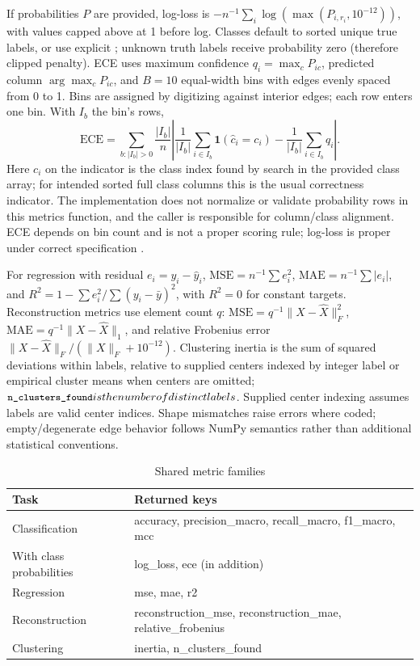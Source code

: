 ﻿\documentclass[conference]{IEEEtran}
\begin{document}
If probabilities \(P\) are provided, log-loss is \(-n^{-1}\sum_i\log(\max(P_{i,r_i},10^{-12}))\), with values capped above at 1 before log. Classes default to sorted unique true labels, or use explicit ; unknown truth labels receive probability zero (therefore clipped penalty). ECE uses maximum confidence \(q_i=\max_cP_{ic}\), predicted column \(\arg\max_cP_{ic}\), and \(B=10\) equal-width bins with edges evenly spaced from 0 to 1. Bins are assigned by digitizing against interior edges; each row enters one bin. With \(I_b\) the bin's rows,
\[
\mathrm{ECE}=\sum_{b:|I_b|>0}\frac{|I_b|}{n}\left|\frac{1}{|I_b|}\sum_{i\in I_b}\mathbf1(\hat c_i=c_i)-\frac{1}{|I_b|}\sum_{i\in I_b}q_i\right|.
\]
Here \(c_i\) on the indicator is the class index found by search in the provided class array; for intended sorted full class columns this is the usual correctness indicator. The implementation does not normalize or validate probability rows in this metrics function, and the caller is responsible for column/class alignment. ECE depends on bin count and is not a proper scoring rule; log-loss is proper under correct specification \cite{gneiting2007}.

For regression with residual \(e_i=y_i-\hat y_i\), \(\mathrm{MSE}=n^{-1}\sum e_i^2\), \(\mathrm{MAE}=n^{-1}\sum|e_i|\), and \(R^2=1-\sum e_i^2/\sum(y_i-\bar y)^2\), with \(R^2=0\) for constant targets. Reconstruction metrics use element count \(q\): \(\mathrm{MSE}=q^{-1}\|X-\hat X\|_F^2\), \(\mathrm{MAE}=q^{-1}\|X-\hat X\|_1\), and relative Frobenius error \(\|X-\hat X\|_F/(\|X\|_F+10^{-12})\). Clustering inertia is the sum of squared deviations within labels, relative to supplied centers indexed by integer label or empirical cluster means when centers are omitted; \(\texttt{\small n\_clusters\_found} is the number of distinct labels\). Supplied center indexing assumes labels are valid center indices. Shape mismatches raise errors where coded; empty/degenerate edge behavior follows NumPy semantics rather than additional statistical conventions.

\begin{table}[t]
\caption{Shared metric families}
\label{tab:metrics}
\centering\small
\begin{tabular}{p{}p{}}
\toprule
Task & Returned keys\\
\midrule
Classification & accuracy, precision\_macro, recall\_macro, f1\_macro, mcc\\
With class probabilities & log\_loss, ece (in addition)\\
Regression & mse, mae, r2\\
Reconstruction & reconstruction\_mse, reconstruction\_mae, relative\_frobenius\\
Clustering & inertia, n\_clusters\_found\\
\bottomrule
\end{tabular}
\end{table}
\end{document}
